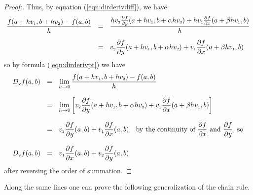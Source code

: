 \begin{proofbar}
\begin{proof}[Proof:]
 Thus, by equation (\ref{eqn:dirderivdiff}), we have
 \begin{align*}
  \frac{f(a+hv_{\scriptscriptstyle 1},b+hv_{\scriptscriptstyle 2}) - f(a,b)}{h} ~~ &= ~~
   \frac{hv_{\scriptscriptstyle 2}\tfrac{\partial f}{\partial y}(a+hv_{\scriptscriptstyle 1},b+\alpha hv_{\scriptscriptstyle 2}) +
    hv_{\scriptscriptstyle 1} \tfrac{\partial f}{\partial x}(a+\beta hv_{\scriptscriptstyle 1},b)}{h}\\[6pt]
   &= ~~ v_{\scriptscriptstyle 2}\frac{\partial f}{\partial y}(a+hv_{\scriptscriptstyle 1},b+\alpha hv_{\scriptscriptstyle 2}) +
    v_{\scriptscriptstyle 1} \frac{\partial f}{\partial x}(a+\beta hv_{\scriptscriptstyle 1},b)
 \end{align*}
 so by formula (\ref{eqn:dirderivpt}) we have
 \begin{align*}
  D_{\scriptscriptstyle \mathbf{v}}f(a,b) ~~ &= ~~ \lim_{h \to 0} \dfrac{f(a+hv_{\scriptscriptstyle 1},b+hv_{\scriptscriptstyle 2}) - f(a,b)}{h}\\[8pt]
   &= ~~ \lim_{h \to 0} \left[ v_{\scriptscriptstyle 2}\frac{\partial f}{\partial y}(a+hv_{\scriptscriptstyle 1},b+\alpha hv_{\scriptscriptstyle 2}) +
    v_{\scriptscriptstyle 1} \frac{\partial f}{\partial x}(a+\beta hv_{\scriptscriptstyle 1},b) \right]\\[8pt]
   &= ~~ v_{\scriptscriptstyle 2}\frac{\partial f}{\partial y}(a,b) +
    v_{\scriptscriptstyle 1}\frac{\partial f}{\partial x}(a,b) \text{~~~by the continuity of $\frac{\partial f}{\partial x}$ and
     $\frac{\partial f}{\partial y}$, so}\\[8pt]
   D_{\scriptscriptstyle \mathbf{v}}f(a,b) ~~ &= ~~ v_{\scriptscriptstyle 1}\frac{\partial f}{\partial x}(a,b) +
    v_{\scriptscriptstyle 2}\frac{\partial f}{\partial y}(a,b)
 \end{align*}
 after reversing the order of summation.
\end{proof}\end{proofbar}

Along the same lines one can prove the following generalization of the chain rule.



